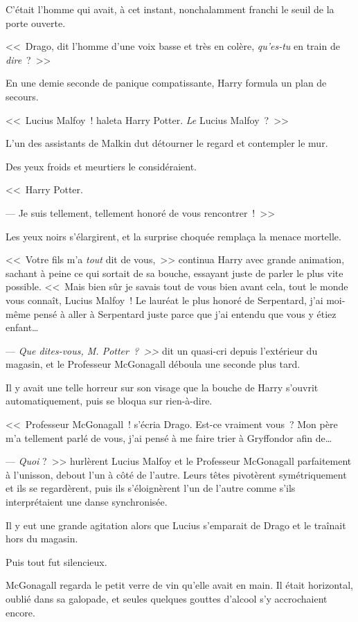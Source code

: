 C'était l'homme qui avait, à cet instant, nonchalamment franchi le seuil de la porte ouverte.

<<~Drago, dit l'homme d'une voix basse et très en colère, \emph{qu'es-tu} en train de \emph{dire}~?~>>

En une demie seconde de panique compatissante, Harry formula un plan de secours.

<<~Lucius Malfoy~! haleta Harry Potter. \emph{Le} Lucius Malfoy~?~>>

L'un des assistants de Malkin dut détourner le regard et contempler le mur.

Des yeux froids et meurtiers le considéraient.

<<~Harry Potter.

--- Je suis tellement, tellement honoré de vous rencontrer~!~>>

Les yeux noirs s'élargirent, et la surprise choquée remplaça la menace mortelle.

<<~Votre fils m'a \emph{tout} dit de vous,~>> continua Harry avec grande animation, sachant à peine ce qui sortait de sa bouche, essayant juste de parler le plus vite possible. <<~Mais bien sûr je savais tout de vous bien avant cela, tout le monde vous connaît, Lucius Malfoy~! Le lauréat le plus honoré de Serpentard, j'ai moi-même pensé à aller à Serpentard juste parce que j'ai entendu que vous y étiez enfant…

--- \emph{Que dites-vous, M. Potter~?~>>} dit un quasi-cri depuis l'extérieur du magasin, et le Professeur McGonagall déboula une seconde plus tard.

Il y avait une telle horreur sur son visage que la bouche de Harry s'ouvrit automatiquement, puis se bloqua sur rien-à-dire.

<<~Professeur McGonagall~! s'écria Drago. Est-ce vraiment vous~? Mon père m'a tellement parlé de vous, j'ai pensé à me faire trier à Gryffondor afin de…

--- \emph{Quoi} ?~>> hurlèrent Lucius Malfoy et le Professeur McGonagall parfaitement à l'unisson, debout l'un à côté de l'autre. Leurs têtes pivotèrent symétriquement et ils se regardèrent, puis ils s'éloignèrent l'un de l'autre comme s'ils interprétaient une danse synchronisée.

Il y eut une grande agitation alors que Lucius s'emparait de Drago et le traînait hors du magasin.

Puis tout fut silencieux.

McGonagall regarda le petit verre de vin qu'elle avait en main. Il était horizontal, oublié dans sa galopade, et seules quelques gouttes d'alcool s'y accrochaient encore.

